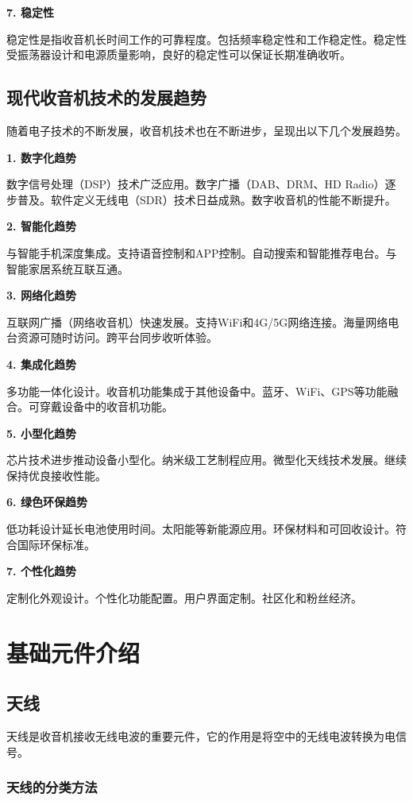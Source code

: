 \documentclass[12pt,UTF8]{ctexbook}
\begin{document}
\textbf{7. 稳定性}

稳定性是指收音机长时间工作的可靠程度。包括频率稳定性和工作稳定性。稳定性受振荡器设计和电源质量影响，良好的稳定性可以保证长期准确收听。

\section{现代收音机技术的发展趋势}

随着电子技术的不断发展，收音机技术也在不断进步，呈现出以下几个发展趋势。

\textbf{1. 数字化趋势}

数字信号处理（DSP）技术广泛应用。数字广播（DAB、DRM、HD Radio）逐步普及。软件定义无线电（SDR）技术日益成熟。数字收音机的性能不断提升。

\textbf{2. 智能化趋势}

与智能手机深度集成。支持语音控制和APP控制。自动搜索和智能推荐电台。与智能家居系统互联互通。

\textbf{3. 网络化趋势}

互联网广播（网络收音机）快速发展。支持WiFi和4G/5G网络连接。海量网络电台资源可随时访问。跨平台同步收听体验。

\textbf{4. 集成化趋势}

多功能一体化设计。收音机功能集成于其他设备中。蓝牙、WiFi、GPS等功能融合。可穿戴设备中的收音机功能。

\textbf{5. 小型化趋势}

芯片技术进步推动设备小型化。纳米级工艺制程应用。微型化天线技术发展。继续保持优良接收性能。

\textbf{6. 绿色环保趋势}

低功耗设计延长电池使用时间。太阳能等新能源应用。环保材料和可回收设计。符合国际环保标准。

\textbf{7. 个性化趋势}

定制化外观设计。个性化功能配置。用户界面定制。社区化和粉丝经济。

\chapter{基础元件介绍}
\section{天线}

天线是收音机接收无线电波的重要元件，它的作用是将空中的无线电波转换为电信号。

\subsection{天线的分类方法}
\end{document}

